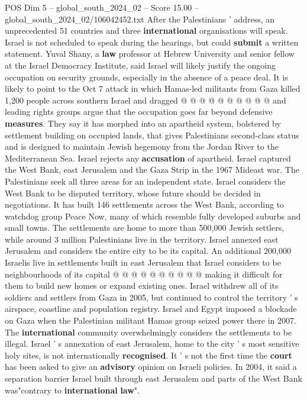 \begin{textsample}{POS Dim 5 – global\_south\_2024\_02 – Score 15.00 – global\_south\_2024\_02/106042452.txt}
After the Palestinians ' address, an unprecedented 51 countries and three \textbf{international} organisations will speak.
Israel is not scheduled to speak during the hearings, but could \textbf{submit} a written statement.
Yuval Shany, a \textbf{law} professor at Hebrew University and senior fellow at the Israel Democracy Institute, said Israel will likely justify the ongoing occupation on security grounds, especially in the absence of a peace deal.
It is likely to point to the Oct 7 attack in which Hamas-led militants from Gaza killed 1,200 people across southern Israel and dragged @ @ @ @ @ @ @ @ @ @ and leading rights groups argue that the occupation goes far beyond defensive \textbf{measures}.
They say it has morphed into an apartheid system, bolstered by settlement building on occupied lands, that gives Palestinians second-class status and is designed to maintain Jewish hegemony from the Jordan River to the Mediterranean Sea.
Israel rejects any \textbf{accusation} of apartheid.
Israel captured the West Bank, east Jerusalem and the Gaza Strip in the 1967 Mideast war.
The Palestinians seek all three areas for an independent state.
Israel considers the West Bank to be disputed territory, whose future should be decided in negotiations.
It has built 146 settlements across the West Bank, according to watchdog group Peace Now, many of which resemble fully developed suburbs and small towns.
The settlements are home to more than 500,000 Jewish settlers, while around 3 million Palestinians live in the territory.
Israel annexed east Jerusalem and considers the entire city to be its capital.
An additional 200,000 Israelis live in settlements built in east Jerusalem that Israel considers to be neighbourhoods of its capital @ @ @ @ @ @ @ @ @ @ making it difficult for them to build new homes or expand existing ones.
Israel withdrew all of its soldiers and settlers from Gaza in 2005, but continued to control the territory ' s airspace, coastline and population registry.
Israel and Egypt imposed a blockade on Gaza when the Palestinian militant Hamas group seized power there in 2007.
The \textbf{international} community overwhelmingly considers the settlements to be illegal.
Israel ' s annexation of east Jerusalem, home to the city ' s most sensitive holy sites, is not internationally \textbf{recognised}.
It ' s not the first time the \textbf{court} has been asked to give an \textbf{advisory} opinion on Israeli policies.
In 2004, it said a separation barrier Israel built through east Jerusalem and parts of the West Bank was"contrary to \textbf{international} \textbf{law}".

\end{textsample}
